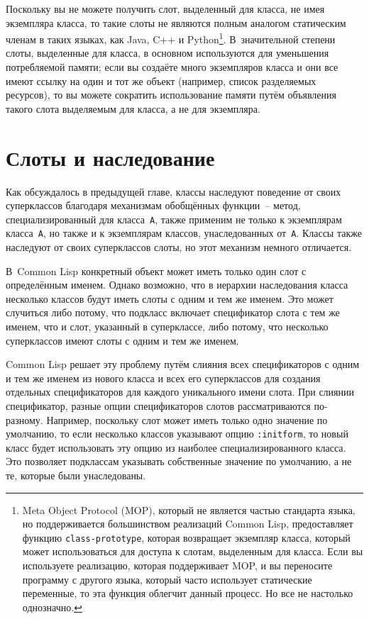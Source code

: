 Поскольку вы не можете получить слот, выделенный для класса, не имея экземпляра класса, то
такие слоты не являются полным аналогом статическим членам в таких языках, как Java, C++ и
Python\footnote{Meta Object Protocol (MOP), который не является частью стандарта языка,
  но поддерживается большинством реализаций Common Lisp, предоставляет функцию
  \lstinline{class-prototype}, которая возвращает экземпляр класса, который может
  использоваться для доступа к слотам, выделенным для класса.  Если вы используете
  реализацию, которая поддерживает MOP, и вы переносите программу с другого языка, который
  часто использует статические переменные, то эта функция облегчит данный процесс.  Но все
  не настолько однозначно.}.  В~значительной степени слоты, выделенные для класса, в
основном используются для уменьшения потребляемой памяти; если вы создаёте много
экземпляров класса и они все имеют ссылку на один и тот же объект (например, список
разделяемых ресурсов), то вы можете сократить использование памяти путём объявления такого
слота выделяемым для класса, а не для экземпляра.

\section{Слоты и наследование}

Как обсуждалось в предыдущей главе, классы наследуют поведение от своих суперклассов
благодаря механизмам обобщённых функции~-- метод, специализированный для класса~\lstinline{A},
также применим не только к экземплярам класса~\lstinline{A}, но также и к экземплярам классов,
унаследованных от~\lstinline{A}.  Классы также наследуют от своих суперклассов слоты, но этот
механизм немного отличается.

В~Common Lisp конкретный объект может иметь только один слот с определённым именем.
Однако возможно, что в иерархии наследования класса несколько классов будут иметь слоты с
одним и тем же именем.  Это может случиться либо потому, что подкласс включает
спецификатор слота с тем же именем, что и слот, указанный в суперклассе, либо потому, что
несколько суперклассов имеют слоты с одним и тем же именем.

Common Lisp решает эту проблему путём слияния всех спецификаторов с одним и тем же именем
из нового класса и всех его суперклассов для создания отдельных спецификаторов для каждого
уникального имени слота.  При слиянии спецификатор, разные опции спецификаторов слотов
рассматриваются по-разному.  Например, поскольку слот может иметь только одно значение по
умолчанию, то если несколько классов указывают опцию \lstinline{:initform}, то новый класс
будет использовать эту опцию из наиболее специализированного класса.  Это позволяет
подклассам указывать собственные значение по умолчанию, а не те, которые были
унаследованы.

